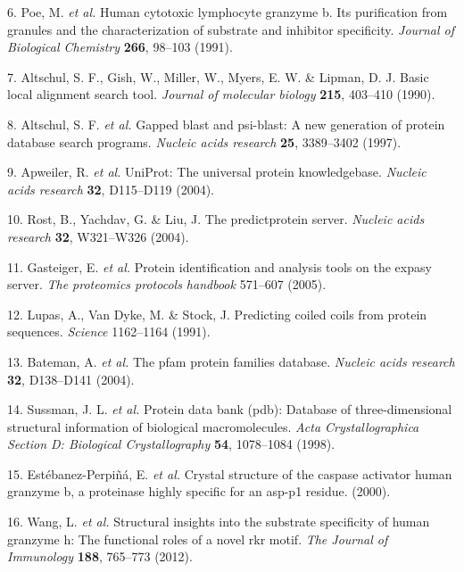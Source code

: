 \documentclass[
]{article}
\begin{document}
\leavevmode\hypertarget{ref-poe1991human}{}%
6. Poe, M. \emph{et al.} Human cytotoxic lymphocyte granzyme b. Its purification from granules and the characterization of substrate and inhibitor specificity. \emph{Journal of Biological Chemistry} \textbf{266}, 98--103 (1991).

\leavevmode\hypertarget{ref-altschul1990basic}{}%
7. Altschul, S. F., Gish, W., Miller, W., Myers, E. W. \& Lipman, D. J. Basic local alignment search tool. \emph{Journal of molecular biology} \textbf{215}, 403--410 (1990).

\leavevmode\hypertarget{ref-altschul1997gapped}{}%
8. Altschul, S. F. \emph{et al.} Gapped blast and psi-blast: A new generation of protein database search programs. \emph{Nucleic acids research} \textbf{25}, 3389--3402 (1997).

\leavevmode\hypertarget{ref-apweiler2004uniprot}{}%
9. Apweiler, R. \emph{et al.} UniProt: The universal protein knowledgebase. \emph{Nucleic acids research} \textbf{32}, D115--D119 (2004).

\leavevmode\hypertarget{ref-rost2004predictprotein}{}%
10. Rost, B., Yachdav, G. \& Liu, J. The predictprotein server. \emph{Nucleic acids research} \textbf{32}, W321--W326 (2004).

\leavevmode\hypertarget{ref-gasteiger2005protein}{}%
11. Gasteiger, E. \emph{et al.} Protein identification and analysis tools on the expasy server. \emph{The proteomics protocols handbook} 571--607 (2005).

\leavevmode\hypertarget{ref-lupas1991predicting}{}%
12. Lupas, A., Van Dyke, M. \& Stock, J. Predicting coiled coils from protein sequences. \emph{Science} 1162--1164 (1991).

\leavevmode\hypertarget{ref-bateman2004pfam}{}%
13. Bateman, A. \emph{et al.} The pfam protein families database. \emph{Nucleic acids research} \textbf{32}, D138--D141 (2004).

\leavevmode\hypertarget{ref-sussman1998protein}{}%
14. Sussman, J. L. \emph{et al.} Protein data bank (pdb): Database of three-dimensional structural information of biological macromolecules. \emph{Acta Crystallographica Section D: Biological Crystallography} \textbf{54}, 1078--1084 (1998).

\leavevmode\hypertarget{ref-estebanez2000crystal}{}%
15. Estébanez-Perpiñá, E. \emph{et al.} Crystal structure of the caspase activator human granzyme b, a proteinase highly specific for an asp-p1 residue. (2000).

\leavevmode\hypertarget{ref-wang2012structural}{}%
16. Wang, L. \emph{et al.} Structural insights into the substrate specificity of human granzyme h: The functional roles of a novel rkr motif. \emph{The Journal of Immunology} \textbf{188}, 765--773 (2012).
\end{document}
